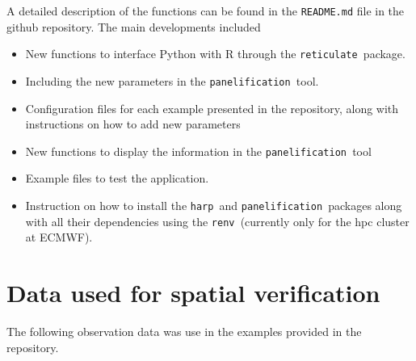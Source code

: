 \documentclass[11pt,a4paper]{article}
\newcommand{\retis}{\texttt{reticulate }}
\newcommand{\panels}{\texttt{panelification }}
\newcommand{\harps}{\texttt{harp }}
\newcommand{\renvs}{\texttt{renv }}
\begin{document}
A detailed description of the functions can be found in the \texttt{README.md} file
in the github repository. 
The main developments included
\begin{itemize}
\item New functions to interface Python with R through the \retis package.
\item Including the new parameters in the \panels tool.
\item Configuration files for each example presented in the repository, along with
instructions on how to add new parameters
\item New functions to display the information in the \panels tool
\item Example files to test the application.
\item Instruction on how to install the \harps and \panels packages along with
 all their dependencies using the \renvs (currently only for the hpc cluster at ECMWF).
\end{itemize}
\section{Data used for spatial verification}
The following observation data was use in the examples provided in the repository.
\end{document}

